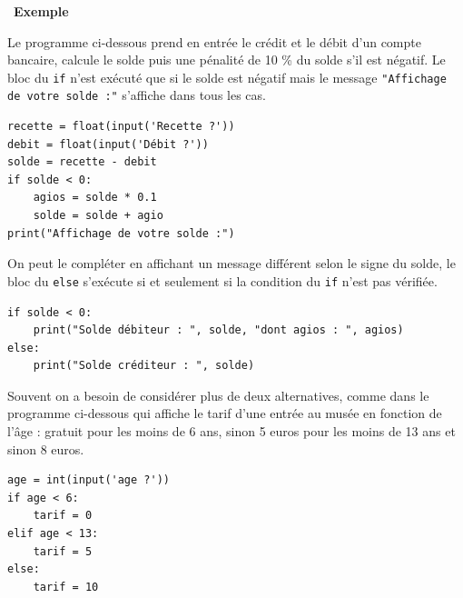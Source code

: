 \documentclass[a4paper, french, 12pt]{article}  %
\newcounter{exple}
\newenvironment{exemple}[1]
{\par \medskip   \addtocounter{exple}{1} \noindent  
\begin{bclogo}[arrondi =0.1,   noborder = true, logo=\bclampe, marge=4]{~\textbf{Exemple} \textbf{\theexple} {\itshape #1} }  \par}
{
\end{bclogo}
 \par \bigskip }
\newcounter{prog}
\begin{document}
\begin{exemple}{}

Le programme ci-dessous prend en entrée le crédit et le débit d'un compte bancaire, calcule le solde puis une pénalité de 10 \% du solde s'il est négatif. Le bloc du  \texttt{if} n'est exécuté que si le solde est négatif mais  le message \texttt{"Affichage de votre solde :"} s'affiche dans tous les cas.

\begin{lstlisting}[style=rond]
recette = float(input('Recette ?'))
debit = float(input('Débit ?'))
solde = recette - debit
if solde < 0:
	agios = solde * 0.1
	solde = solde + agio
print("Affichage de votre solde :")
\end{lstlisting}

On peut le compléter en affichant un message différent selon le signe du solde, le bloc du \texttt{else} s'exécute si et  seulement si la condition du \texttt{if} n'est pas vérifiée.

\begin{lstlisting}[style=rond]
if solde < 0:
	print("Solde débiteur : ", solde, "dont agios : ", agios)
else:
	print("Solde créditeur : ", solde)
\end{lstlisting}


Souvent on a besoin de considérer plus de deux alternatives, comme dans le programme ci-dessous qui affiche le tarif d'une entrée au musée en fonction de l'âge  :  gratuit pour les moins de 6 ans, sinon 5 euros pour les moins de 13 ans et sinon 8 euros.

\begin{lstlisting}[style=rond]
age = int(input('age ?'))
if age < 6:
	tarif = 0
elif age < 13:
	tarif = 5
else:
	tarif = 10
\end{lstlisting}


\end{exemple}
\end{document}
